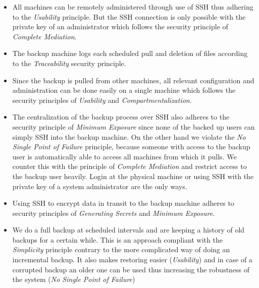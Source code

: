 \documentclass[english]{article}
\begin{document}
\begin{itemize}
    \item All machines can be remotely administered through use of SSH thus adhering to the \emph{Usability} principle. But the SSH connection is only possible with the private key of an administrator which follows the security principle of \emph{Complete Mediation}.
\end{itemize}


\begin{itemize}
    \item The backup machine logs each scheduled pull and deletion of files according to the \emph{Traceability} security principle.
    \item Since the backup is pulled from other machines, all relevant configuration and administration can  be done easily on a single machine which follows the security principles of \emph{Usability} and \emph{Compartmentalization}.
    \item The centralization of the backup process over SSH also adheres to the security principle of \emph{Minimum Exposure} since none of the backed up users can simply SSH into the backup machine. On the other hand we violate the \emph{No Single Point of Failure} principle, because someone with access to the backup user is automatically able to access all machines from which it pulls. We counter this with the principle of \emph{Complete Mediation} and restrict access to the backup user heavily. Login at the physical machine or using SSH with the private key of a system administrator are the only ways.
    \item Using SSH to encrypt data in transit to the backup machine adheres to security principles of \emph{Generating Secrets} and \emph{Minimum Exposure}. 
    \item We do a full backup at scheduled intervals and are keeping a history of old backups for a certain while. This is an approach compliant with the \emph{Simplicity} principle contrary to the more complicated way of doing an incremental backup. It also makes restoring easier (\emph{Usability}) and in case of a corrupted backup an older one can be used thus increasing the robustness of the system (\emph{No Single Point of Failure})
\end{itemize}
\end{document}
